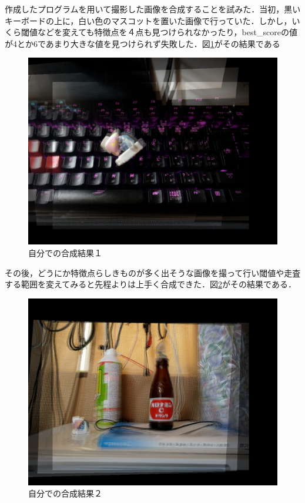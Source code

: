 \documentclass[11pt]{jarticle}
\begin{document}
作成したプログラムを用いて撮影した画像を合成することを試みた．当初，黒いキーボードの上に，白い色のマスコットを置いた画像で行っていた．しかし，いくら閾値などを変えても特徴点を４点も見つけられなかったり，best\_scoreの値が4とか6であまり大きな値を見つけられず失敗した．図\ref{8-1.jpg}がその結果である
\begin{figure}[ht]
    \centering
    \includegraphics[scale=.5]{8-1.jpg}
    \caption{自分での合成結果１}
    \label{8-1.jpg}
\end{figure}

その後，どうにか特徴点らしきものが多く出そうな画像を撮って行い閾値や走査する範囲を変えてみると先程よりは上手く合成できた．図\ref{8-2.jpg}がその結果である．
\begin{figure}[ht]
    \centering
    \includegraphics[scale=.5]{8-2.jpg}
    \caption{自分での合成結果２}
    \label{8-2.jpg}
\end{figure}
\end{document}
